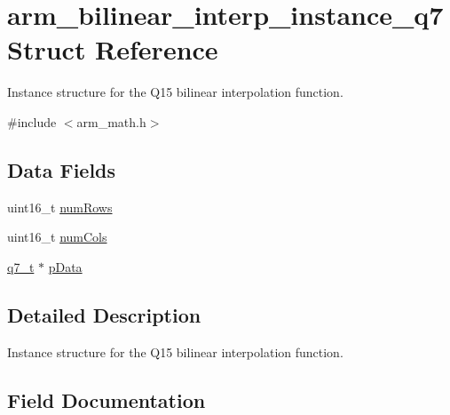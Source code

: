 \hypertarget{structarm__bilinear__interp__instance__q7}{}\section{arm\+\_\+bilinear\+\_\+interp\+\_\+instance\+\_\+q7 Struct Reference}
\label{structarm__bilinear__interp__instance__q7}


Instance structure for the Q15 bilinear interpolation function.  




{\ttfamily \#include $<$arm\+\_\+math.\+h$>$}

\subsection*{Data Fields}
\begin{DoxyCompactItemize}
\item 
uint16\+\_\+t \mbox{\hyperlink{structarm__bilinear__interp__instance__q7_a1bcf80ccdc2acc29198f1592ae300390}{num\+Rows}}
\item 
uint16\+\_\+t \mbox{\hyperlink{structarm__bilinear__interp__instance__q7_a4bb5ec0d13eb4c9cf887aa8366a44117}{num\+Cols}}
\item 
\mbox{\hyperlink{arm__math_8h_ae541b6f232c305361e9b416fc9eed263}{q7\+\_\+t}} $\ast$ \mbox{\hyperlink{structarm__bilinear__interp__instance__q7_afde7546ea2ec5df9fe42fb04d128a016}{p\+Data}}
\end{DoxyCompactItemize}


\subsection{Detailed Description}
Instance structure for the Q15 bilinear interpolation function. 

\subsection{Field Documentation}
\mbox{\label{structarm__bilinear__interp__instance__q7_a4bb5ec0d13eb4c9cf887aa8366a44117}} 
